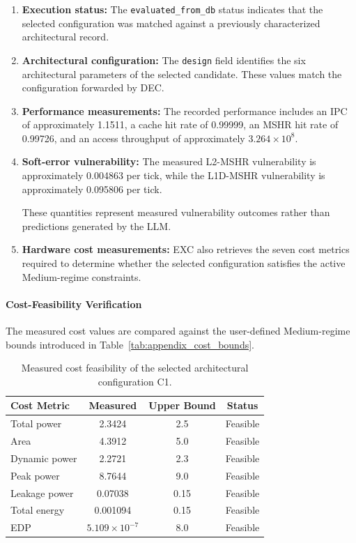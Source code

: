 \begin{enumerate}

\item \textbf{Execution status:}
The \texttt{evaluated\_from\_db} status
indicates that the selected configuration
was matched against a previously
characterized architectural record.

\item \textbf{Architectural configuration:}
The \texttt{design} field identifies the
six architectural parameters of the
selected candidate. These values match
the configuration forwarded by DEC.

\item \textbf{Performance measurements:}
The recorded performance includes an
IPC of approximately 1.1511, a cache
hit rate of 0.99999, an MSHR hit rate
of 0.99726, and an access throughput
of approximately $3.264 \times 10^8$.

\item \textbf{Soft-error vulnerability:}
The measured L2-MSHR vulnerability is
approximately 0.004863 per tick, while
the L1D-MSHR vulnerability is approximately
0.095806 per tick.

These quantities represent measured
vulnerability outcomes rather than
predictions generated by the LLM.

\item \textbf{Hardware cost measurements:}
EXC also retrieves the seven cost metrics
required to determine whether the selected
configuration satisfies the active
Medium-regime constraints.

\end{enumerate}

\paragraph{Cost-Feasibility Verification}

The measured cost values are compared
against the user-defined Medium-regime
bounds introduced in
Table~\ref{tab:appendix_cost_bounds}.

\begin{table}[htbp]
\centering
\caption{Measured cost feasibility of the
selected architectural configuration C1.}
\label{tab:illustrative_exc_feasibility}
\renewcommand{\arraystretch}{1.1}
\small
\begin{tabular}{lccc}
\hline
\textbf{Cost Metric} &
\textbf{Measured} &
\textbf{Upper Bound} &
\textbf{Status} \\
\hline
Total power & 2.3424 & 2.5 & Feasible \\
Area & 4.3912 & 5.0 & Feasible \\
Dynamic power & 2.2721 & 2.3 & Feasible \\
Peak power & 8.7644 & 9.0 & Feasible \\
Leakage power & 0.07038 & 0.15 & Feasible \\
Total energy & 0.001094 & 0.15 & Feasible \\
EDP & $5.109\times10^{-7}$ & 8.0 & Feasible \\
\hline
\end{tabular}
\end{table}


